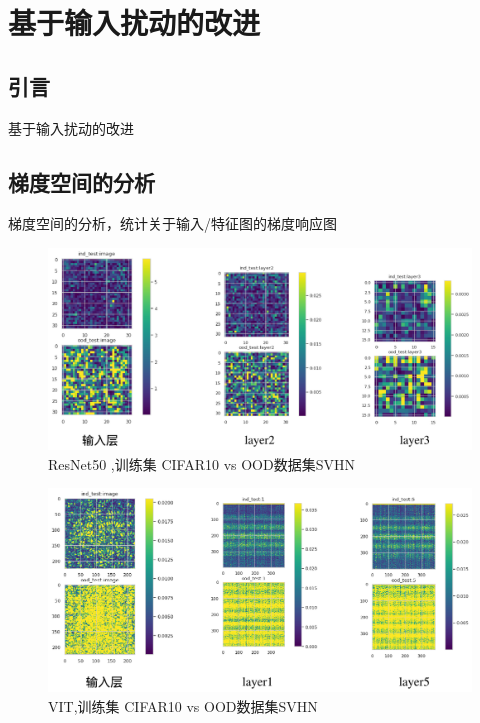 \chapter{基于输入扰动的改进}


\section{引言}
基于输入扰动的改进

\section{梯度空间的分析}
梯度空间的分析，统计关于输入/特征图的梯度响应图

\begin{figure}[H]
    \centering
    \includegraphics[width=0.75\linewidth]{assets/3-1.png}
    \caption{ResNet50 ,训练集 CIFAR10 vs OOD数据集SVHN
}
    \label{fig:enter-label}
\end{figure}

\begin{figure}[H]
    \centering
    \includegraphics[width=0.75\linewidth]{assets/3-2.png}
    \caption{VIT,训练集 CIFAR10 vs OOD数据集SVHN
}
    \label{fig:enter-label}
\end{figure}

